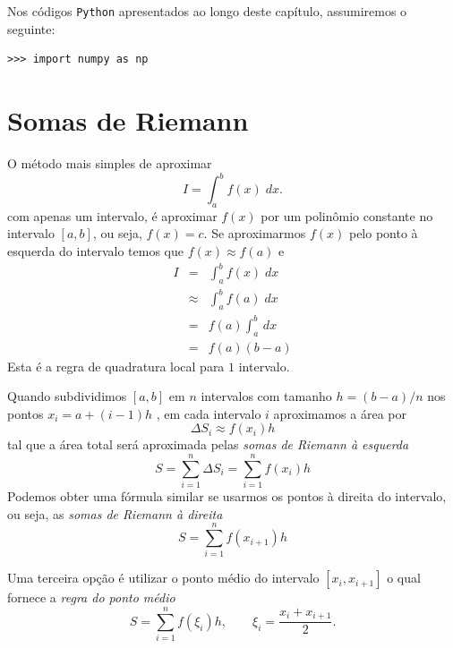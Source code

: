 \ifispython
Nos códigos \verb+Python+ apresentados ao longo deste capítulo, assumiremos o seguinte:
\begin{verbatim}
>>> import numpy as np
\end{verbatim}
\fi

\section{Somas de Riemann}
O método mais simples de aproximar
\begin{equation}
 I = \int_a^b f(x) \;dx.
\end{equation}
com apenas um intervalo, é aproximar $f(x)$ por um polinômio constante no intervalo $[a,b]$, ou seja, $f(x)=c$. Se aproximarmos $f(x)$ pelo ponto à esquerda do intervalo temos que $f(x)\approx f(a)$ e
\begin{eqnarray}
 I &=& \int_a^b f(x) \;dx\\
   &\approx& \int_a^b f(a) \;dx \\
   &=& f(a) \int_a^b\,dx\\
   &=& f(a) (b-a)
\end{eqnarray}
Esta é a regra de quadratura local para $1$ intervalo.

Quando subdividimos $[a,b]$ em $n$ intervalos com tamanho $h=(b-a)/n$ nos pontos $x_i=a+(i-1)h$ , em cada intervalo $i$ aproximamos a área por
\begin{equation}
  \Delta S_i \approx f(x_i)h
\end{equation}
tal que a área total será aproximada pelas \emph{somas de Riemann à esquerda}
\begin{equation}
S =\sum_{i=1}^{n} \Delta S_i = \sum_{i=1}^{n} f(x_i) h
\end{equation}
Podemos obter uma fórmula similar se usarmos os pontos à direita do intervalo, ou seja, as \emph{somas de Riemann à direita}
\begin{equation}
S = \sum_{i=1}^{n} f(x_{i+1}) h
\end{equation}

Uma terceira opção é utilizar o ponto médio do intervalo $[x_i,x_{i+1}]$ o qual fornece a \emph{regra do ponto médio}
\begin{equation}\label{eq:regra_do_ponto_medio}
S = \sum_{i=1}^{n} f(\xi_i ) h, \qquad \xi_i=\frac{x_i+x_{i+1}}{2}.
\end{equation}

